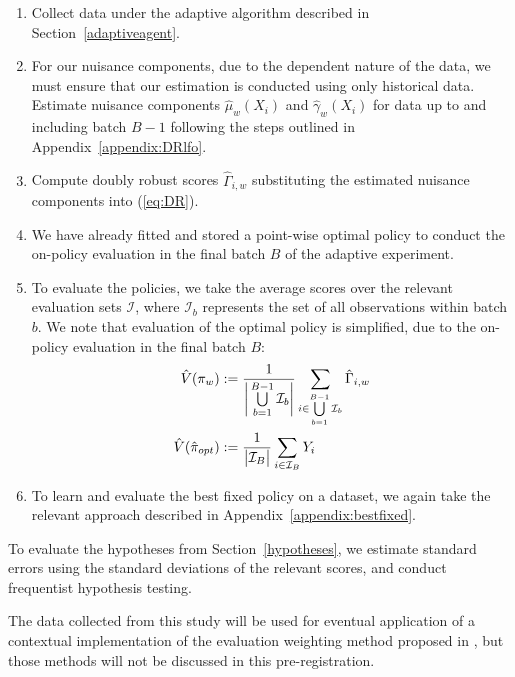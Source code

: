 \documentclass[letterpaper, 12pt, parskip=full,]{scrartcl}
\begin{document}
\begin{enumerate}
\item Collect data under the adaptive algorithm described in Section~\ref{adaptiveagent}. 
\item For our nuisance components, due to the dependent nature of the data, we must ensure that our estimation is conducted using only historical data. Estimate nuisance components $\hat{\mu}_{w}(X_i)$  and $\hat\gamma_w(X_i)$ for data up to and including batch $B-1$ following the steps outlined in Appendix~\ref{appendix:DRlfo}. 
\item Compute doubly robust scores $\hat{\Gamma}_{i,w}$ substituting the estimated nuisance components into (\ref{eq:DR}). 
\item We have already fitted and stored a point-wise optimal policy to conduct the on-policy evaluation in the final batch $B$ of the adaptive experiment. 
  \item To evaluate the policies, we take the average scores over the relevant evaluation sets $\mathcal{I}$, where $\mathcal{I}_b$ represents the set of all observations within batch $b$. We note that evaluation of the optimal policy is simplified, due to the on-policy evaluation in the final batch $B$:
      \begin{align}
          \hat{V}({\pi}_{w})  &:= \frac{1}{\bigg{\lvert} \bigcup\limits_{b=1}^{B-1} \mathcal{I}_{b} \bigg{\rvert}} \sum_{i \in \bigcup\limits_{b=1}^{B-1} \mathcal{I}_{b} } \hat{\Gamma}_{i,w} \\
                     \hat{V}(\hat{\pi}_{opt})  &:= \frac{1}{\big{\lvert}  \mathcal{I}_{B} \big{\rvert}} \sum_{i \in \mathcal{I}_{B} }
                      Y_i  
    \end{align}
   \item To learn and evaluate the best fixed policy on a dataset, we again take the relevant approach described in Appendix~\ref{appendix:bestfixed}. 
\end{enumerate}

To evaluate the hypotheses from Section~\ref{hypotheses}, we estimate standard errors using the standard deviations of the relevant scores, and conduct frequentist hypothesis testing. 

The data collected from this study will be used for eventual application of a contextual implementation of the evaluation weighting method proposed in \cite{hadad2019confidence}, but those methods will not be discussed in this pre-registration.
\end{document}
